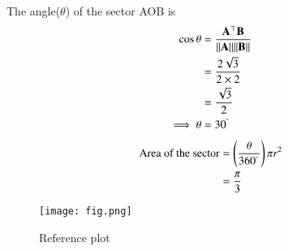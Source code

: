 \documentclass[journal,12pt,twocolumn]{IEEEtran}
\begin{document}
The angle($\theta$) of the sector AOB is 
\begin{align}
    \cos{\theta}&=\frac{\mathbf{A}^{\top}\mathbf{B}}{\lVert\mathbf{A}\rVert\lVert\mathbf{B}\rVert}\\
    &=\frac{2\sqrt{3}}{2\times 2}\\
    &=\frac{\sqrt{3}}{2}\\
    \implies \theta &= 30^{\degree}
\end{align}
\begin{align}
    \text{Area of the sector}&=\left(\frac{\theta}{360^{\degree}}\right)\pi r^2\\
    &= \frac{\pi}{3}
\end{align}
\begin{figure}[!h]
 \centering
 \texttt{[image: fig.png]}
 \caption{Reference plot}
 \label{plot}
\end{figure}
\end{document}
